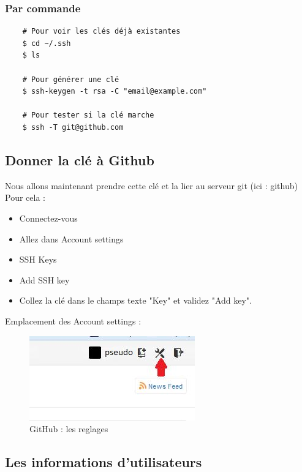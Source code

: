 \subsubsection{Par commande}

\begin{verbatim}
	# Pour voir les clés déjà existantes
	$ cd ~/.ssh
	$ ls
	
	# Pour générer une clé
	$ ssh-keygen -t rsa -C "email@example.com"
	
	# Pour tester si la clé marche
	$ ssh -T git@github.com
\end{verbatim}

\newpage
\subsection{Donner la clé à Github}

Nous allons maintenant prendre cette clé et la lier au serveur git (ici : github)\\
Pour cela :

\begin{itemize}
	\item Connectez-vous
	\item Allez dans Account settings
	\item SSH Keys
	\item Add SSH key
	\item Collez la clé dans le champs texte "Key" et validez "Add key".
\end{itemize}

Emplacement des Account settings :

\begin{figure}[h] 
	\begin{center}
		\includegraphics[scale=0.5]{../IMG/githubsettings.jpg}
	\end{center}
	\caption{GitHub : les reglages}
	\label{GitHub : les reglages} 
\end{figure}

\subsection{Les informations d'utilisateurs}

